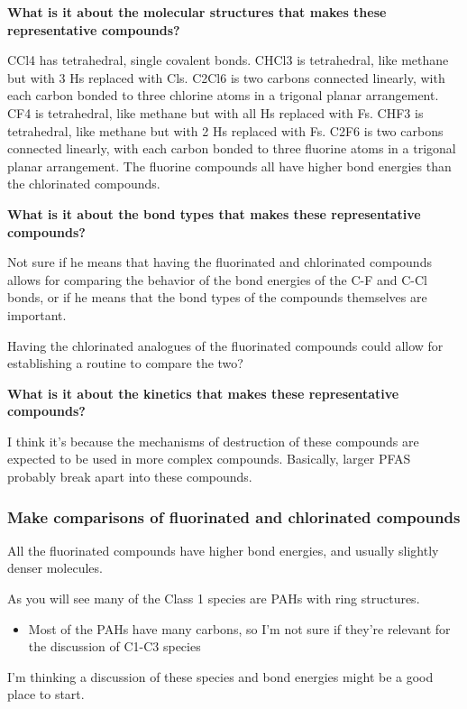 \documentclass{article}
\begin{document}
    \textbf{What is it about the molecular structures that makes these representative compounds?}

        CCl4 has tetrahedral, single covalent bonds. CHCl3 is tetrahedral, like methane but with 3 Hs replaced with Cls. C2Cl6 is two carbons connected linearly, with each carbon bonded to three chlorine atoms in a trigonal planar arrangement. CF4 is tetrahedral, like methane but with all Hs replaced with Fs. CHF3 is tetrahedral, like methane but with 2 Hs replaced with Fs. C2F6 is two carbons connected linearly, with each carbon bonded to three fluorine atoms in a trigonal planar arrangement. The fluorine compounds all have higher bond energies than the chlorinated compounds. 

    \textbf{What is it about the bond types that makes these representative compounds?}

        Not sure if he means that having the fluorinated and chlorinated compounds allows for comparing the behavior of the bond energies of the C-F and C-Cl bonds, or if he means that the bond types of the compounds themselves are important.

        Having the chlorinated analogues of the fluorinated compounds could allow for establishing a routine to compare the two?

    \textbf{What is it about the kinetics that makes these representative compounds?}

        I think it's because the mechanisms of destruction of these compounds are expected to be used in more complex compounds. Basically, larger PFAS probably break apart into these compounds.
\subsubsection*{Make comparisons of fluorinated and chlorinated compounds}

    All the fluorinated compounds have higher bond energies, and usually slightly denser molecules.

As you will see many of the Class 1 species are PAHs with ring structures.  
\begin{itemize}
    \item Most of the PAHs have many carbons, so I'm not sure if they're relevant for the discussion of C1-C3 species
\end{itemize}

I’m thinking a discussion of these species and bond energies might be a good place to start.
\end{document}
